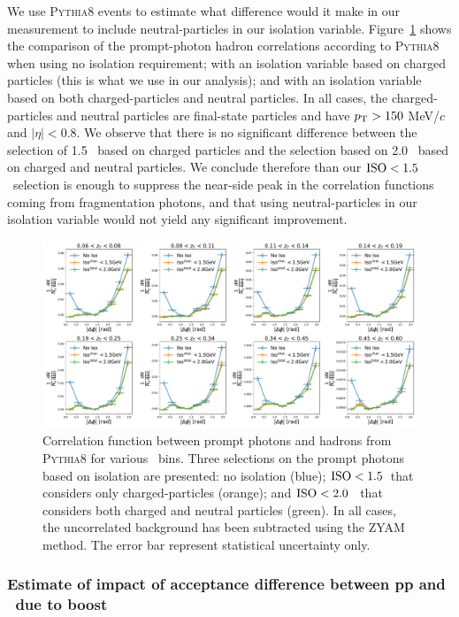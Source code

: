 We use \textsc{Pythia8} events to estimate what difference would it make in our measurement to include neutral-particles in our isolation variable. Figure~\ref{fig:PythiaNeutralIsolation} shows the comparison of the prompt-photon hadron correlations according to \textsc{Pythia8} when using no isolation requirement; with an isolation variable based on charged particles (this is what we use in our analysis); and with an isolation variable based on both charged-particles and neutral particles. In all cases, the charged-particles and neutral particles are final-state particles and have $p_{\mathrm{T}}>150$ MeV/$c$ and $|\eta|<0.8$. We observe that there is no significant difference between the selection of 1.5 \GeVc~based on charged particles and the selection based on 2.0 \GeVc~based on charged and neutral particles. We conclude therefore than our $\mathrm{ISO}<1.5$ \GeVc~selection is enough to suppress the near-side peak in the correlation functions coming from fragmentation photons, and that using neutral-particles in our isolation variable would not yield any significant improvement.

\begin{figure}
\centering
\includegraphics[width = 1.0 \textwidth]{PythiaStudyNeutralIso}
\caption{Correlation function between prompt photons and hadrons from \textsc{Pythia8} for various \zt~bins. Three selections on the prompt photons based on isolation are presented: no isolation (blue); $\mathrm{ISO}< 1.5$\GeVc~that considers only charged-particles (orange); and $\mathrm{ISO}<2.0$ \GeVc~that considers both charged and neutral particles (green). In all cases, the uncorrelated background has been subtracted using the ZYAM method. The error bar represent statistical uncertainty only. }
\label{fig:PythiaNeutralIsolation}
\end{figure}


\subsubsection{Estimate of impact of acceptance difference between pp and \pPb~due to boost}
\label{sec:bootstudy}

